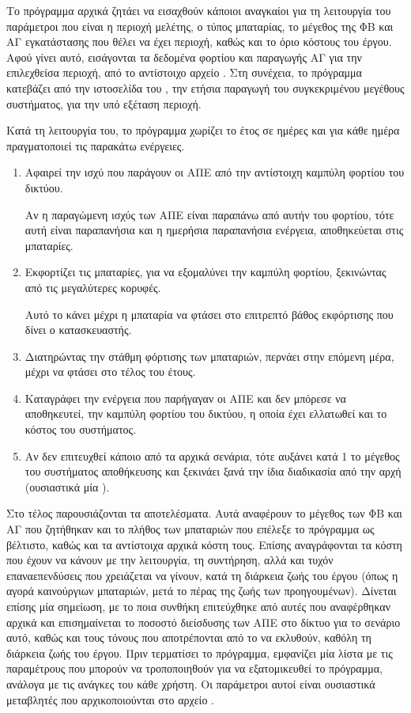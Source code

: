 \documentclass[12pt]{report}
\begin{document}
Το πρόγραμμα αρχικά ζητάει να εισαχθούν κάποιοι αναγκαίοι για τη λειτουργία του παράμετροι που είναι η περιοχή μελέτης, ο τύπος μπαταρίας, το μέγεθος της ΦΒ και ΑΓ εγκατάστασης που θέλει να έχει περιοχή, καθώς και το όριο κόστους 
του έργου. Αφού γίνει αυτό, εισάγονται τα δεδομένα φορτίου και παραγωγής ΑΓ για την επιλεχθείσα περιοχή, από το αντίστοιχο αρχείο {}. Στη συνέχεια, το πρόγραμμα κατεβάζει από την ιστοσελίδα του {}, 
την ετήσια παραγωγή του συγκεκριμένου μεγέθους συστήματος, για την υπό εξέταση περιοχή. 

Κατά τη λειτουργία του, το πρόγραμμα χωρίζει το έτος σε ημέρες και για κάθε ημέρα πραγματοποιεί τις παρακάτω ενέργειες. 

\begin{enumerate}
\item Αφαιρεί την ισχύ που παράγουν οι ΑΠΕ από την αντίστοιχη καμπύλη φορτίου του δικτύου. 

			Αν η παραγώμενη ισχύς των ΑΠΕ είναι παραπάνω από αυτήν του φορτίου, τότε αυτή είναι παραπανήσια και η ημερήσια παραπανήσια ενέργεια, αποθηκεύεται στις μπαταρίες.
\item Εκφορτίζει τις μπαταρίες, για να εξομαλύνει την καμπύλη φορτίου, ξεκινώντας από τις μεγαλύτερες κορυφές. 

			Αυτό το κάνει μέχρι η μπαταρία να φτάσει στο επιτρεπτό βάθος εκφόρτισης που δίνει ο κατασκευαστής.
\item Διατηρώντας την στάθμη φόρτισης των μπαταριών, περνάει στην επόμενη μέρα, μέχρι να φτάσει στο τέλος του έτους.
\item Καταγράφει την ενέργεια που παρήγαγαν οι ΑΠΕ και δεν μπόρεσε να αποθηκευτεί, την καμπύλη φορτίου του δικτύου, η οποία έχει ελλατωθεί και το κόστος του συστήματος.
\item Αν δεν επιτευχθεί κάποιο από τα αρχικά σενάρια, τότε αυξάνει κατά 1 το μέγεθος του συστήματος αποθήκευσης και ξεκινάει ξανά την ίδια διαδικασία από την αρχή (ουσιαστικά μία {}).
\end{enumerate}

Στο τέλος παρουσιάζονται τα αποτελέσματα. Αυτά αναφέρουν το μέγεθος των ΦΒ και ΑΓ που ζητήθηκαν και το πλήθος των μπαταριών που επέλεξε το πρόγραμμα ως βέλτιστο, καθώς και τα αντίστοιχα αρχικά κόστη τους. Επίσης αναγράφονται τα κόστη
που έχουν να κάνουν με την λειτουργία, τη συντήρηση, αλλά και τυχόν επαναεπενδύσεις που χρειάζεται να γίνουν, κατά τη διάρκεια ζωής του έργου (όπως η αγορά καινούργιων μπαταριών, μετά το πέρας της ζωής των προηγουμένων). Δίνεται 
επίσης μία σημείωση, με το ποια συνθήκη επιτεύχθηκε από αυτές που αναφέρθηκαν αρχικά και επισημαίνεται το ποσοστό διείσδυσης των ΑΠΕ στο δίκτυο για το σενάριο αυτό, καθώς και τους τόνους {} που αποτρέπονται από το
να εκλυθούν, καθόλη τη διάρκεια ζωής του έργου. Πριν τερματίσει το πρόγραμμα, εμφανίζει μία λίστα με τις παραμέτρους που μπορούν να τροποποιηθούν για να εξατομικευθεί το πρόγραμμα, ανάλογα με τις ανάγκες του κάθε χρήστη. 
Οι παράμετροι αυτοί είναι ουσιαστικά μεταβλητές που αρχικοποιούνται στο αρχείο {}.
\end{document}
